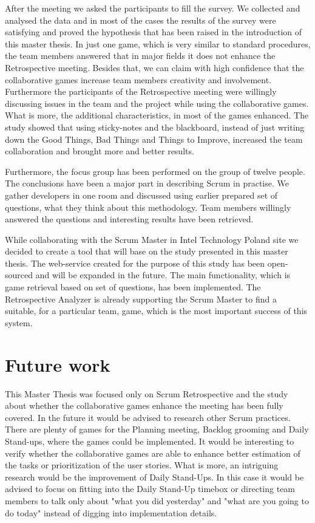 After the meeting we asked the participants to fill the survey. We collected and analysed the data and in most of the cases the results of the survey were satisfying and proved the hypothesis that has been raised in the introduction of this master thesis. In just one game, which is very similar to standard procedures, the team members answered that in major fields it does not enhance the Retrospective meeting. Besides that, we can claim with high confidence that the collaborative games increase team members creativity and involvement. Furthermore the participants of the Retrospective meeting were willingly discussing issues in the team and the project while using the collaborative games. What is more, the additional characteristics, in most of the games enhanced. The study showed that using sticky-notes and the blackboard, instead of just writing down the Good Things, Bad Things and Things to Improve, increased the team collaboration and brought more and better results.

Furthermore, the focus group has been performed on the group of twelve people. The conclusions have been a major part in describing Scrum in practise. We gather developers in one room and discussed using earlier prepared set of questions, what they think about this methodology. Team members willingly answered the questions and interesting results have been retrieved.

While collaborating with the Scrum Master in Intel Technology Poland site we decided to create a tool that will base on the study presented in this master thesis. The web-service created for the purpose of this study has been open-sourced and will be expanded in the future. The main functionality, which is game retrieval based on set of questions, has been implemented. The Retrospective Analyzer is already supporting the Scrum Master to find a suitable, for a particular team, game, which is the most important success of this system.

\section{Future work}

This Master Thesis was focused only on Scrum Retrospective and the study about whether the collaborative games enhance the meeting has been fully covered. In the future it would be advised to research other Scrum practices. There are plenty of games for the Planning meeting, Backlog grooming and Daily Stand-ups, where the games could be implemented. It would be interesting to verify whether the collaborative games are able to enhance better estimation of the tasks or prioritization of the user stories. What is more, an intriguing research would be the improvement of Daily Stand-Ups. In this case it would be advised to focus on fitting into the Daily Stand-Up timebox or directing team members to talk only about "what you did yesterday" and "what are you going to do today" instead of digging into implementation details.

